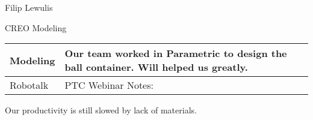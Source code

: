 Filip Lewulis

CREO Modeling 

\begin{tabular}{|p{5cm}|p{5cm}|}
  \hline
  Modeling&
  Our team worked in Parametric to design the ball container. Will helped us greatly.\\
  \hline
  Robotalk&
  PTC Webinar Notes:
  
  
  
  \\
  \hline
\end{tabular}

Our productivity is still slowed by lack of materials.
  
